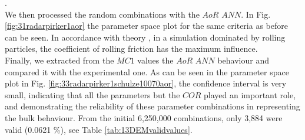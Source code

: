 \documentclass{CFD2015}
\begin{document}
\citet{RefWorks:87}.\\
We then processed the random combinations with the $AoR$ $ANN$. In Fig.
\ref{fig:31radarpirker1aor} the parameter space plot for the same criteria as
before can be seen.
In accordance with theory \cite{RefWorks:87}, in a simulation dominated
by rolling particles, the coefficient of rolling friction has the maximum
influence. \\
Finally, we extracted from the $MC1$ values the $AoR$ $ANN$ behaviour
and compared it with the experimental one.
As can be seen in the parameter space plot in Fig.
\ref{fig:33radarpirker1schulze10070aor}, the confidence interval is very small,
indicating that all the parameters but the $COR$ played an important role, 
and demonstrating the reliability of these parameter
combinations in representing the bulk behaviour.
From the initial 6,250,000 combinations, only 3,884 were valid (0.0621
\%), see Table \ref{tab:13DEMvalidvalues}.
\end{document}
